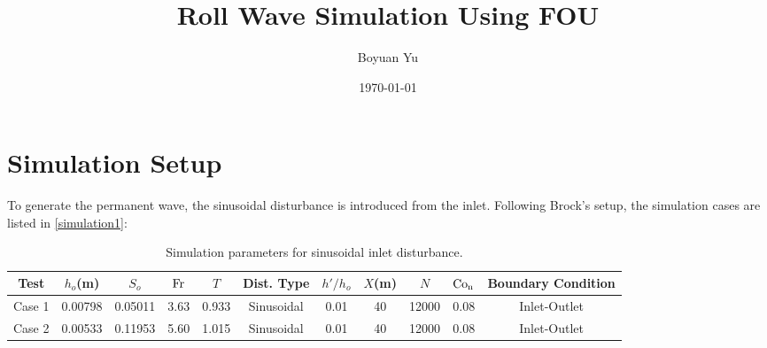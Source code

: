\documentclass[a4paper]{article}
\title{Roll Wave Simulation Using FOU}
\author{
Boyuan Yu}
\date{\today}
\newcommand{\fr}{\rm{Fr}}
\begin{document}
\maketitle



\section{Simulation Setup}
To generate the permanent wave, the sinusoidal disturbance is introduced from the inlet. Following Brock's setup, the simulation cases are listed in \autoref{simulation1}:
\begin{table}[htbp]
	\centering
	\caption{Simulation parameters for sinusoidal inlet disturbance.}
	\label{simulation1}
	\begin{threeparttable}
		\begin{tabular}{ccccccccccc}
			\toprule
			Test & $h_o$(m) & $S_o$ & $\fr$ & $T$ & Dist. Type & $h'/h_o$ & $X$(m) &$N$ &$\rm{Co_n}$&Boundary Condition \\
			\midrule
			Case 1  & 0.00798 & 0.05011 & 3.63 & 0.933 &Sinusoidal & 0.01 & 40 &12000 & 0.08&Inlet-Outlet \\
			Case 2 & 0.00533 & 0.11953 & 5.60 & 1.015 & Sinusoidal & 0.01 & 40 &12000 &0.08&Inlet-Outlet\\
			\bottomrule    
		\end{tabular}

	\end{threeparttable}
\end{table}
\end{document}
